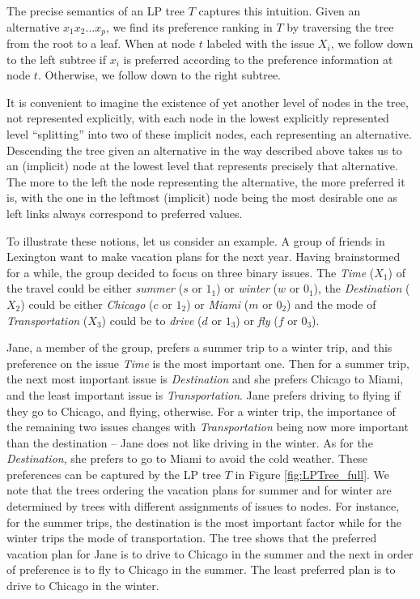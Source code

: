 The precise semantics of an LP tree $T$ captures this intuition. Given 
an alternative $x_1x_2\ldots x_p$, we find its preference ranking in 
$T$ by traversing the tree from the root to a leaf. When at node $t$ 
labeled with the issue $X_i$, we follow down to the left subtree if
$x_i$ is preferred according to the preference information at node
$t$. Otherwise, we follow down to the right subtree. 

It is convenient to imagine the existence of yet another level of nodes 
in the tree, not represented explicitly, with each node in the lowest 
explicitly represented level ``splitting'' into two of these
implicit nodes, each representing an alternative. Descending the tree 
given an alternative in the way described above takes us to an (implicit) 
node at the lowest level that represents precisely that alternative.
The more to the left the node representing the alternative, the more 
preferred it is, with the one in the leftmost (implicit) node being the 
most desirable one as left links always correspond to preferred values.

To illustrate these notions, let us consider an example. A group 
of friends in Lexington want to make vacation plans for the 
next year. Having brainstormed for a while, the group decided to focus 
on three binary issues. The \textit{Time} ($X_1$) of the travel could be 
either \textit{summer} ($s$ or $1_1$) or \textit{winter} ($w$ or $0_1$), 
the \textit{Destination} ($X_2$) could be either \textit{Chicago} 
($c$ or $1_2$) or \textit{Miami} ($m$ or $0_2$) and the mode of 
\textit{Transportation} ($X_3$) could be to \textit{drive} ($d$ or $1_3$)
or \textit{fly} ($f$ or $0_3$).
      
Jane, a member of the group, prefers a summer trip to a winter trip, and 
this preference on the issue \textit{Time} is the most important one.  
Then for a summer trip, the next most important issue is \textit{Destination} 
and she prefers Chicago to Miami, and the least important issue is 
\textit{Transportation}. Jane prefers driving to flying if they go
to Chicago, and flying, otherwise.  For a winter trip, the importance of
the remaining two issues changes with \textit{Transportation} being now
more important than the destination -- Jane does not like 
driving in the winter. As for the \textit{Destination}, she prefers to go 
to Miami to avoid the cold weather. These preferences can be captured by 
the LP tree $T$ in Figure \ref{fig:LPTree_full}. We note that the 
trees ordering the vacation plans for summer and for winter are determined 
by trees with different assignments of issues to nodes. For instance, for 
the summer trips, the destination is the most important factor while 
for the winter trips the mode of transportation. The tree shows that
the preferred vacation plan for Jane is to drive to Chicago in 
the summer and the next in order of preference is to fly to Chicago in the 
summer. The least preferred plan is to drive to Chicago in the winter.


